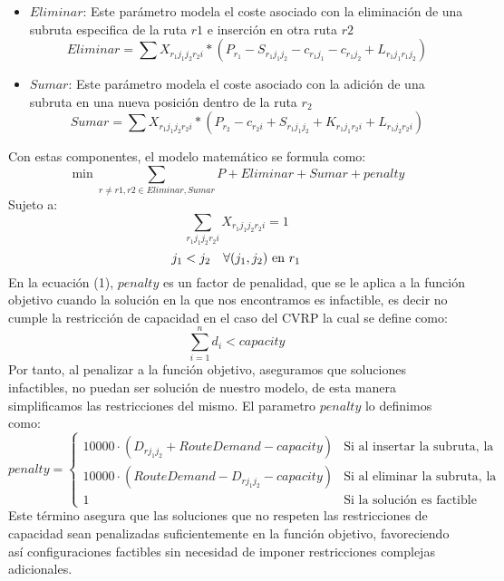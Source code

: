 \documentclass{article}
\begin{document}
\begin{itemize}
\item {$Eliminar$: Este parámetro modela el coste asociado con la eliminación de una subruta especifica de la ruta $r1$ e inserción en otra ruta $r2$}
\[
Eliminar=\sum X_{{r_1}{j_1}{j_2}{r_2}{i}}*(P_{r_1}-S_{{r_1}{j_1}{j_2}}-c_{{r_1}{j_1}}-c_{{r_1}{j_2}}+L_{{r_1}{j_1}{r_1}{j_2}})
\]
\item {$Sumar$: Este parámetro modela el coste asociado con la adición de una subruta en una nueva posición dentro de la ruta $r_2$}
 \[
Sumar=\sum  X_{{r_1}{j_1}{j_2}{r_2}{i}}*(P_{r_2} - c_{{r_2}{i}} + S_{{r_1}{j_1}{j_2}}+K_{{r_1}{j_1}{r_2}{i}} + L_{{r_1}{j_2}{r_2}{i}}) 
\] 
\end{itemize}
Con estas componentes, el modelo matemático se formula como:
\begin{equation}
\min \sum \limits_{r \neq r1,r2 \in Eliminar,Sumar} P + Eliminar + Sumar + penalty
\end{equation}
Sujeto a:
\begin{equation}
\sum \limits_{r_1j_1j_2r_2i} X_{{r_1}{j_1}{j_2}{r_2}{i}} = 1 
\end{equation}
\begin{equation}
j_1 < j_2 \hspace{10 pt} \forall (j_1,j_2) \text{ en } r_1
\end{equation}
En la ecuación (1), $penalty$ es un factor de penalidad, que se le aplica a la función objetivo cuando la solución en la que nos encontramos es infactible, es decir no cumple la restricción de capacidad en el caso del CVRP la cual se define como:
\begin{equation}
\sum \limits_{i=1}^{n} d_i < capacity
\end{equation}
Por tanto, al penalizar a la función objetivo, aseguramos que soluciones infactibles, no puedan ser solución de nuestro modelo, de esta manera simplificamos las restricciones del mismo. El parametro $penalty$ lo definimos como:
\[
penalty = 
\begin{cases}
    10 000 \cdot  (D_{rj_1j_2} + RouteDemand - capacity) & \text{Si al insertar la subruta, la solución es infactible} \\
    10 000 \cdot (RouteDemand - D_{rj_1j_2} - capacity) & \text{Si al eliminar la subruta, la solución continua siendo infactible}\\
    1 & \text{Si la solución es factible} 
\end{cases}
\]
Este término asegura que las soluciones que no respeten las restricciones de capacidad sean penalizadas suficientemente en la función objetivo, favoreciendo así configuraciones factibles sin necesidad de imponer restricciones complejas adicionales.


 
\end{document}
